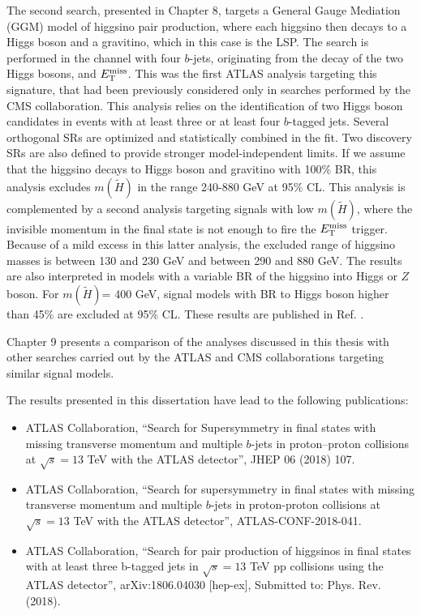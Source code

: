\documentclass[11pt,a4paper]{article}
\newcommand{\cmtre}{\ensuremath{\sqrt{s}  =  13}\xspace}
\newcommand{\met}{\ensuremath{E_{\rm T}^{\mathrm{miss}}}\xspace}
\def\mhino{\ensuremath{m(\tilde{H})}\xspace}
\begin{document}
The second search, presented in Chapter 8, targets a General Gauge Mediation (GGM) model of higgsino pair production, where each higgsino then decays to a Higgs boson and 
a gravitino, which in this case is the LSP. 
The search is performed in the channel with four $b$-jets, originating from 
the decay of the two Higgs bosons, and \met. 
This was the first ATLAS analysis targeting this signature, that had been 
previously considered only in searches performed by the CMS collaboration.
This analysis relies on the identification of two Higgs boson candidates in events with at least three or 
at least four $b$-tagged jets. Several orthogonal SRs are optimized and statistically combined in the fit. 
Two discovery SRs are also defined to provide stronger model-independent limits. 
If we assume that the higgsino decays to Higgs boson and gravitino with 100\% BR, 
this analysis excludes \mhino in the range 240-880 GeV at 95\% CL. 
This analysis is complemented by a second analysis targeting signals with low \mhino, where the 
invisible momentum in the final state is not enough to fire the \met trigger. 
Because of a mild excess in this latter analysis, the excluded range of higgsino masses is 
between 130 and 230 GeV and between 290 and 880 GeV.
The results are also interpreted in models with a variable BR of the higgsino into Higgs or $Z$ boson. 
For \mhino = 400 GeV, signal models with BR to Higgs boson higher than 45\% are 
excluded at 95\% CL.
These results are published in Ref. \cite{Aaboud:2018htj}. 


Chapter 9 presents a comparison of the analyses discussed in this thesis with other searches carried out 
by the ATLAS and CMS collaborations targeting similar signal models. 

The results presented in this dissertation have lead to the following publications:

\begin{itemize}
\item  ATLAS Collaboration, ``Search for Supersymmetry in final states with missing transverse momentum and multiple $b$-jets in proton–proton collisions at \cmtre TeV with the ATLAS detector'', JHEP 06 (2018) 107. 
\item  ATLAS Collaboration, ``Search for supersymmetry in final states with missing transverse momentum and multiple $b$-jets in proton-proton collisions at \cmtre TeV with the ATLAS detector'', ATLAS-CONF-2018-041.
\item  ATLAS Collaboration, ``Search for pair production of higgsinos in final states with at least three b-tagged jets in \cmtre TeV pp collisions using the ATLAS detector'',  
arXiv:1806.04030 [hep-ex], 
Submitted to: Phys. Rev. (2018).
\end{itemize}
\end{document}
